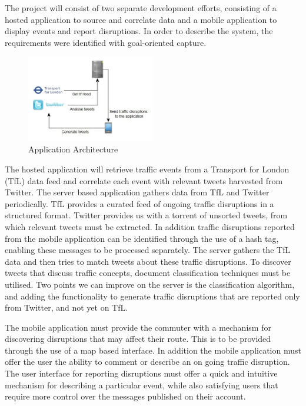 The project will consist of two separate development efforts, consisting of a hosted application to source and correlate data and a mobile application to display events and report disruptions. In order to describe the system, the requirements were identified with goal-oriented capture\cite{Requirements}.

\begin{figure}[here]
\begin{center}
\includegraphics[width=0.5\textwidth]{images/draft_architecture.jpg}
\end{center}
\vspace{-20pt}
\caption{Application Architecture}
\end{figure}

The hosted application will retrieve traffic events from a Transport for London (TfL) data feed and correlate each event with relevant tweets harvested from Twitter. The server based application gathers data from TfL and Twitter periodically. TfL provides a curated feed of ongoing traffic disruptions in a structured format. Twitter provides us with a torrent of unsorted tweets, from which relevant tweets must be extracted. In addition traffic disruptions reported from the mobile application can be identified through the use of a hash tag, enabling these messages to be processed separately. The server gathers the TfL data and then tries to match tweets about these traffic disruptions. To discover tweets that discuss traffic concepts, document classification techniques must be utilised. Two points we can improve on the server is the classification algorithm, and adding the functionality to generate traffic disruptions that are reported only from Twitter, and not yet on TfL.

The mobile application must provide the commuter with a mechanism for discovering disruptions that may affect their route. This is to be provided through the use of a map based interface. In addition the mobile application must offer the user the ability to comment or describe an on going traffic disruption. The user interface for reporting disruptions must offer a quick and intuitive mechanism for describing a particular event, while also satisfying users that require more control over the messages published on their account.

